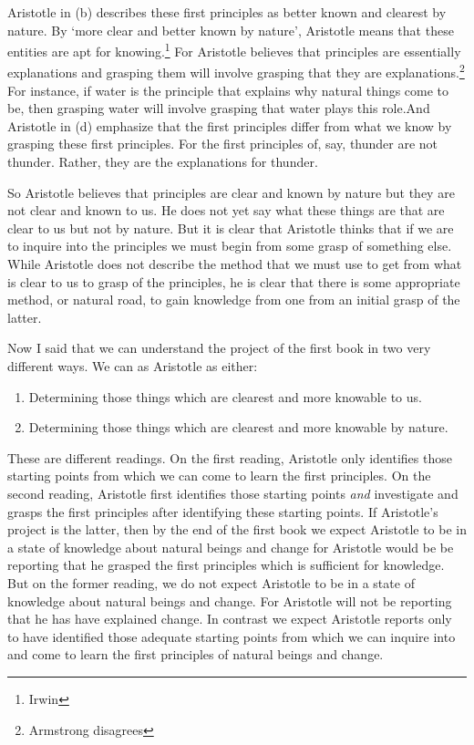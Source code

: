 \documentclass[10pt, oneside]{book}
\begin{document}
Aristotle in (b) describes these first principles as better known and clearest by nature. By `more clear and better known by nature', Aristotle means that these entities are apt for knowing.\footnote{Irwin } For Aristotle believes that principles are essentially explanations and grasping them will involve grasping that they are explanations.\footnote{Armstrong disagrees} For instance, if water is the principle that explains why natural things come to be, then grasping water will involve grasping that water plays this role.And Aristotle in (d) emphasize that the first principles differ from what we know by grasping these first principles. For the first principles of, say, thunder are not thunder. Rather, they are the explanations for thunder.


So Aristotle believes that principles are clear and known by nature but they are not clear and known to us. He does not yet say what these things are that are clear to us but not by nature. But it is clear that Aristotle thinks that if we are to inquire into the principles we must begin from some grasp of something else. While Aristotle does not describe the method that we must use to get from what is clear to us to grasp of the principles, he is clear that there is some appropriate method, or natural road, to gain knowledge from one from an initial grasp of the latter.

Now I said that we can understand the project of the first book in two very different ways. We can as Aristotle as either:
\begin{enumerate}
\item Determining those things which are clearest and more knowable to us.
\item Determining those things which are clearest and more knowable by nature.  
\end{enumerate}

These are different readings. On the first reading,  Aristotle only identifies those starting points from which we can come to learn the first principles.   On the second reading, Aristotle first identifies those starting points \emph{and} investigate and grasps the first principles after identifying these starting points. If Aristotle's project is the latter, then by the end of the first book we expect Aristotle to be in a state of knowledge about natural beings and change for Aristotle would be be reporting that he grasped the first principles which is sufficient for knowledge. But on the former reading, we do not expect Aristotle to be in a state of knowledge about natural beings and change. For Aristotle will not be reporting that he has have explained change. In contrast we expect Aristotle reports  only to have identified those adequate starting points from which we can inquire into and come to learn the first principles of natural beings and change. 
\end{document}
